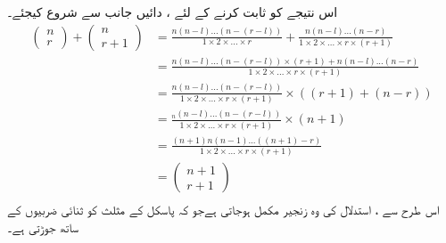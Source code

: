 اس نتیجے کو ثابت کرنے کے لئے ، دائیں جانب سے شروع کیجئے۔ 
\begin{align*}
  \begin{pmatrix}
     n\\r
     \end{pmatrix}
     +
    \begin{pmatrix}
     n\\r+1
     \end{pmatrix} &=\frac{ n(n-l) ... (n-(r-l)) }{1\times2\times...\times r}+\frac{n(n-l) ... (n-r) }{1\times2\times...\times r\times(r+1)}\\
    &= \frac{ n(n-l) ... (n-(r-l)) \times (r+ 1) + n(n-l) ... (n-r) }{1\times2\times...\times r\times(r+1)}\\
      &= \frac{n(n-l) ... (n-(r-l)) }{1\times2\times...\times r\times(r+1)}\times((r+1)+(n-r))\\
   &=\frac{_n(n-l) ... (n-(r-l)) }{1\times2\times...\times r\times(r+1)}\times(n+1)\\  
    &=\frac{ ( n + 1 )n( n -1) ... ((  n + 1) -r) }{1\times2\times...\times r\times(r+1)}\\
  &=  \begin{pmatrix}
     n+1\\r+1
     \end{pmatrix}\\
     \end{align*}
اس طرح سے ، استدلال کی وہ    زنجیر مکمل ہوجاتی ہےجو کہ پاسکل کے مثلث کو ثنائی ضربیوں کے ساتھ جوڑتی ہے۔ 

